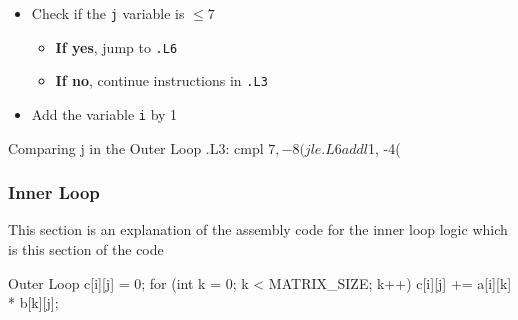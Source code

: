 \documentclass[12pt, a4paper]{article}
\begin{document}
                \begin{itemize}
                    \item Check if the \texttt{j} variable is $\leq 7$
                    \begin{itemize}
                        \item \textbf{If yes}, jump to \texttt{.L6}
                        \item \textbf{If no}, continue instructions in \texttt{.L3}
                    \end{itemize}
                    \item Add the variable \texttt{i} by 1
                \end{itemize}
                \begin{codeblock}[minted language=asm]{Comparing j in the Outer Loop}
                    .L3:
                        cmpl    $7, -8(%
                        jle .L6
                        addl    $1, -4(%
                \end{codeblock}

    \pagebreak

            \subsubsection{Inner Loop}
                This section is an explanation of the assembly code for the inner loop logic which is this section of the code
                \begin{codeblock}[minted language=c]{Outer Loop}
                    c[i][j] = 0;
                    for (int k = 0; k < MATRIX_SIZE; k++) {
                        c[i][j] += a[i][k] * b[k][j];
                    }
                \end{codeblock}
\end{document}
